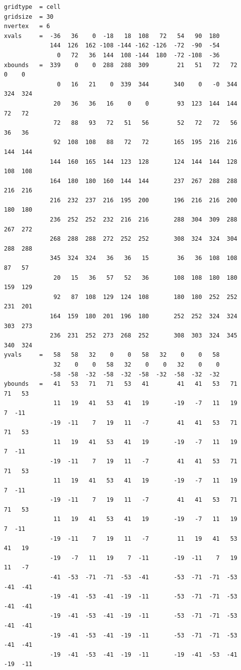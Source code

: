 \begin{lstlisting}[frame=single, backgroundcolor=\color{zebg}, basicstyle=\footnotesize]
gridtype  = cell
gridsize  = 30
nvertex   = 6
xvals     =  -36   36    0  -18   18  108   72   54   90  180 
             144  126  162 -108 -144 -162 -126  -72  -90  -54
               0   72   36  144  108 -144  180  -72 -108  -36 
xbounds   =  339    0    0  288  288  309        21   51   72   72    0    0
               0   16   21    0  339  344       340    0   -0  344  324  324
              20   36   36   16    0    0        93  123  144  144   72   72
              72   88   93   72   51   56        52   72   72   56   36   36
              92  108  108   88   72   72       165  195  216  216  144  144
             144  160  165  144  123  128       124  144  144  128  108  108
             164  180  180  160  144  144       237  267  288  288  216  216
             216  232  237  216  195  200       196  216  216  200  180  180
             236  252  252  232  216  216       288  304  309  288  267  272
             268  288  288  272  252  252       308  324  324  304  288  288
             345  324  324   36   36   15        36   36  108  108   87   57
              20   15   36   57   52   36       108  108  180  180  159  129
              92   87  108  129  124  108       180  180  252  252  231  201
             164  159  180  201  196  180       252  252  324  324  303  273
             236  231  252  273  268  252       308  303  324  345  340  324
yvals     =   58   58   32    0    0   58   32    0    0   58
              32    0    0   58   32    0    0   32    0    0
             -58  -58  -32  -58  -32  -58  -32  -58  -32  -32 
ybounds   =   41   53   71   71   53   41        41   41   53   71   71   53
              11   19   41   53   41   19       -19   -7   11   19    7  -11
             -19  -11    7   19   11   -7        41   41   53   71   71   53
              11   19   41   53   41   19       -19   -7   11   19    7  -11
             -19  -11    7   19   11   -7        41   41   53   71   71   53
              11   19   41   53   41   19       -19   -7   11   19    7  -11
             -19  -11    7   19   11   -7        41   41   53   71   71   53
              11   19   41   53   41   19       -19   -7   11   19    7  -11
             -19  -11    7   19   11   -7        11   19   41   53   41   19
             -19   -7   11   19    7  -11       -19  -11    7   19   11   -7
             -41  -53  -71  -71  -53  -41       -53  -71  -71  -53  -41  -41
             -19  -41  -53  -41  -19  -11       -53  -71  -71  -53  -41  -41
             -19  -41  -53  -41  -19  -11       -53  -71  -71  -53  -41  -41
             -19  -41  -53  -41  -19  -11       -53  -71  -71  -53  -41  -41
             -19  -41  -53  -41  -19  -11       -19  -41  -53  -41  -19  -11
\end{lstlisting}

